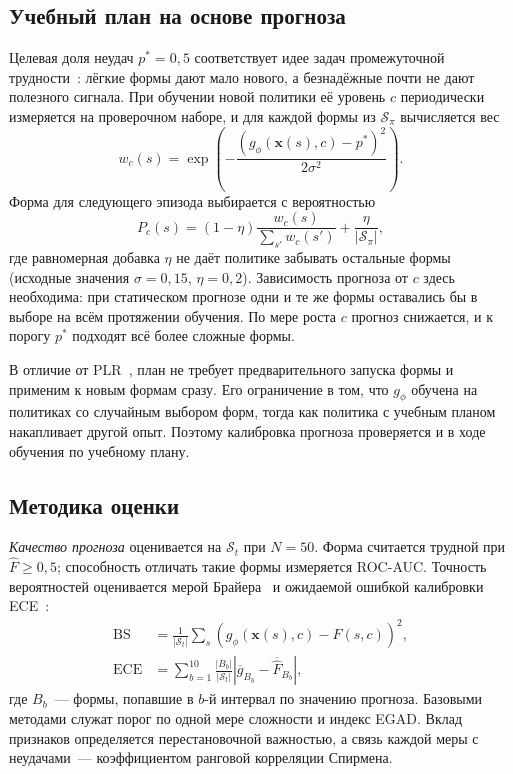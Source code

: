 \documentclass{misisarticle}
\begin{document}
\subsection{Учебный план на основе прогноза}

Целевая доля неудач $p^{*} = 0{,}5$ соответствует идее задач промежуточной трудности~\cite{florensa2018}: лёгкие формы дают мало нового, а безнадёжные почти не дают полезного сигнала. При обучении новой политики её уровень $c$ периодически измеряется на проверочном наборе, и для каждой формы из $\mathcal{S}_\pi$ вычисляется вес
\begin{equation}
  w_c(s) = \exp\left( -\frac{\left(g_\phi(\mathbf{x}(s), c) - p^{*}\right)^2}{2\sigma^2} \right).
  \label{eq:weight}
\end{equation}
Форма для следующего эпизода выбирается с вероятностью
\begin{equation}
  P_c(s) = (1 - \eta) \frac{w_c(s)}{\sum_{s'} w_c(s')} + \frac{\eta}{|\mathcal{S}_\pi|},
  \label{eq:sampling}
\end{equation}
где равномерная добавка $\eta$ не даёт политике забывать остальные формы (исходные значения $\sigma = 0{,}15$, $\eta = 0{,}2$). Зависимость прогноза от $c$ здесь необходима: при статическом прогнозе одни и те же формы оставались бы в выборе на всём протяжении обучения. По мере роста $c$ прогноз снижается, и к порогу $p^{*}$ подходят всё более сложные формы.

В отличие от PLR~\cite{jiang2021}, план не требует предварительного запуска формы и применим к новым формам сразу. Его ограничение в том, что $g_\phi$ обучена на политиках со случайным выбором форм, тогда как политика с учебным планом накапливает другой опыт. Поэтому калибровка прогноза проверяется и в ходе обучения по учебному плану.

\subsection{Методика оценки}

\textit{Качество прогноза} оценивается на $\mathcal{S}_t$ при $N = 50$. Форма считается трудной при $\hat{F} \ge 0{,}5$; способность отличать такие формы измеряется ROC-AUC. Точность вероятностей оценивается мерой Брайера~\cite{brier1950} и ожидаемой ошибкой калибровки ECE~\cite{guo2017}:
\begin{align}
  \mathrm{BS} &= \frac{1}{|\mathcal{S}_t|} \sum_{s} \left( g_\phi(\mathbf{x}(s), c) - \hat{F}(s, c) \right)^2, \label{eq:brier} \\
  \mathrm{ECE} &= \sum_{b=1}^{10} \frac{|B_b|}{|\mathcal{S}_t|} \left| \overline{g}_{B_b} - \overline{\hat{F}}_{B_b} \right|, \label{eq:ece}
\end{align}
где $B_b$~--- формы, попавшие в $b$-й интервал по значению прогноза. Базовыми методами служат порог по одной мере сложности и индекс EGAD. Вклад признаков определяется перестановочной важностью, а связь каждой меры с неудачами~--- коэффициентом ранговой корреляции Спирмена.
\end{document}
